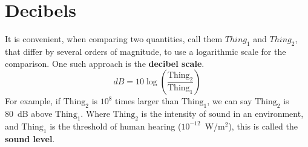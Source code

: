 \documentclass[11pt]{article}
\begin{document}




  


\clearpage
\appendix

\section{Decibels}
\label{sec:dB}

It is convenient, when comparing two quantities, call them $Thing_1$ 
and $Thing_2$, that differ by several orders of magnitude, to use a
logarithmic scale for the comparison. One such approach is the
\textbf{decibel scale}.
\begin{equation}
  dB = 10 \log \left( \frac{\mathrm{Thing_2}}{\mathrm{Thing_1}} \right)
  \label{eq:db}
\end{equation}
For example, if $\mathrm{Thing_2}$ is $10^8$ times larger than
$\mathrm{Thing_1}$, we can say $\mathrm{Thing_2}$ is 80~dB above
$\mathrm{Thing_1}$. Where $\mathrm{Thing_2}$ is the intensity
of sound in an environment, and $\mathrm{Thing_1}$ is the threshold of
human hearing ($10^{-12}$~W/m$^2$), this is called the
\textbf{sound level}.
\end{document}
